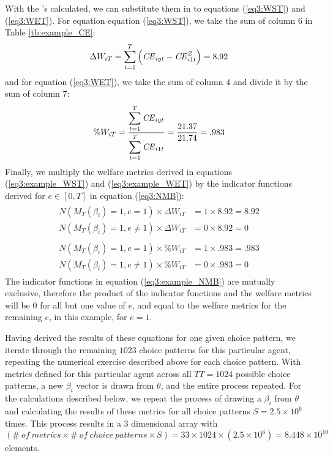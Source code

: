 \documentclass[../main.tex]{subfiles}
\begin{document}
With the {\CE}'s calculated, we can substitute them in to equations (\ref{eq3:WST}) and (\ref{eq3:WET}).
For equation equation (\ref{eq3:WST}), we take the sum of column $6$ in Table \ref{tb:example_CE}:
\begin{equation}
	\label{eq3:example_WST}
	\Delta W_{iT} = \sum_{t=1}^T \left( {\mathit{CE}}_{iyt} - {\mathit{CE}}_{i1t}^Z \right) = 8.92
\end{equation}
\noindent and for equation (\ref{eq3:WET}), we take the sum of column $4$ and divide it by the sum of column $7$:
\begin{equation}
	\label{eq3:example_WET}
	\%W_{iT} = \frac{\displaystyle\sum_{t=1}^{T} {\mathit{CE}}_{iyt} }{\displaystyle\sum_{t=1}^{T} {\mathit{CE}}_{i1t}} = \frac{21.37}{21.74} = .983
\end{equation}
\noindent Finally, we multiply the welfare metrics derived in equations (\ref{eq3:example_WST}) and (\ref{eq3:example_WET}) by the indicator functions derived for $e \in [0,T]$ in equation (\ref{eq3:NMB}):
\begin{align}
	\label{eq3:example_NMBWST}
	\begin{split}
		N( M_T(\beta_i) = 1, e = 1 )  \times \Delta W_{iT} &= 1 \times 8.92 = 8.92\\
		N( M_T(\beta_i) = 1, e \neq 1 )  \times \Delta W_{iT} &= 0 \times 8.92 = 0
	\end{split}
\end{align}
\begin{align}
	\label{eq3:example_NMBWET}
	\begin{split}
		N( M_T(\beta_i) = 1, e = 1 )  \times \%W_{iT} &= 1 \times .983 = .983\\
		N( M_T(\beta_i) = 1, e \neq 1 )  \times \%W_{iT} &= 0 \times .983 = 0
	\end{split}
\end{align}
\noindent The indicator functions in equation (\ref{eq3:example_NMB}) are mutually exclusive, therefore the product of the indicator functions and the welfare metrics will be $0$ for all but one value of $e$, and equal to the welfare metrics for the remaining $e$, in this example, for $e = 1$.

Having derived the results of these equations for one given choice pattern, we iterate through the remaining $1023$ choice patterns for this particular agent, repeating the numerical exercise described above for each choice pattern.
With metrics defined for this particular agent across all $TT = 1024$ possible choice patterns, a new $\beta_i$ vector is drawn from $\theta$, and the entire process repeated.
For the calculations described below, we repeat the process of drawing a $\beta_i$ from $\theta$ and calculating the results of these metrics for all choice patterns $S = 2.5 \times 10^6$ times.
This process results in a $3$ dimensional array with $(\mathit{\#\ of\ metrics} \times \mathit{\#\ of\ choice\ patterns} \times S) = 33 \times 1024 \times (2.5 \times 10^6) = 8.448 \times 10^{10}$ elements.
\end{document}
